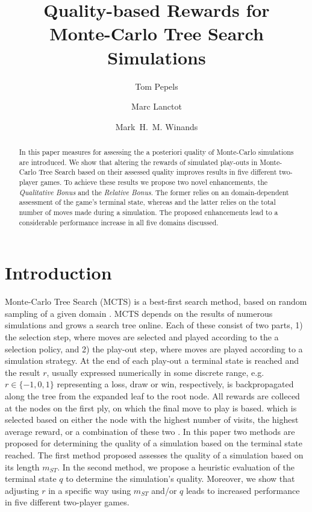 \documentclass{ecai2010}
\begin{document}
\title{Quality-based Rewards for \\ Monte-Carlo Tree Search Simulations}

\author{Tom Pepels \and Marc Lanctot \and Mark~H.~M. Winands  }

\maketitle


\begin{abstract}
In this paper measures for assessing the a posteriori quality of Monte-Carlo simulations are introduced. We show that altering the rewards of simulated play-outs in Monte-Carlo Tree Search based on their assessed quality improves results in five different two-player games. To achieve these results we propose two novel enhancements, the \emph{Qualitative Bonus} and the \emph{Relative Bonus}. The former relies on an domain-dependent assessment of the game's terminal state, whereas and the latter relies on the total number of moves made during a simulation. The proposed enhancements lead to a considerable performance increase in all five domains discussed.
\end{abstract}

\section{Introduction}
\label{sec:intro}
Monte-Carlo Tree Search (MCTS) is a best-first search method, based on random sampling of a given domain \cite{kocsis2006bandit, coulom2007efficient}. MCTS depends on the results of numerous simulations and grows a search tree online. Each of these consist of two parts, 1) the selection step, where moves are selected and played according to the a selection policy, and 2) the play-out step, where moves are played according to a simulation strategy. At the end of each play-out a terminal state is reached and the result $r$, usually expressed numerically in some discrete range, e.g. $r \in \{-1, 0, 1\}$ representing a loss, draw or win, respectively, is backpropagated along the tree from the expanded leaf to the root node. All rewards are colleced at the nodes on the first ply, on which the final move to play is based. which is selected based on either the node with the highest number of visits, the highest average reward, or a combination of these two \cite{chaslot2008progressive}. In this paper two methods are proposed for determining the quality of a simulation based on the terminal state reached. The first method proposed assesses the quality of a simulation based on its length $m_{ST}$. In the second method, we propose a heuristic evaluation of the terminal state $q$ to determine the simulation's quality. Moreover, we show that adjusting $r$ in a specific way using  $m_{ST}$ and/or $q$ leads to increased performance in five different two-player games.
\end{document}
